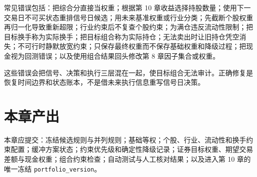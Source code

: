 \begin{warningbox}
常见错误包括：把综合分直接当权重；根据第 10 章收益选择持股数量；使用下一交易日不可买状态重排信号日候选；用未来基准权重或行业分类；先截断个股权重再归一化导致重新超限；行业约束后不复查个股约束；为满仓违反流动性限制；把目标换手称为实际换手；把目标组合称为实际持仓；无法卖出时让旧持仓凭空消失；不可行时静默放宽约束；只保存最终权重而不保存基础权重和降级过程；把现金视为回测错误；以及使用组合结果回头修改第 8 章因子集合或权重。
\end{warningbox}

这些错误会把信号、决策和执行三层混在一起，使目标组合无法审计。正确修复是恢复时间边界和状态账本，不是借未来执行信息重写信号日决策。

\section{本章产出}

\begin{outputbox}
本章应提交：冻结候选规则与并列规则；基础等权；个股、行业、流动性和换手约束配置；缓冲方案状态；约束优先级和确定性降级记录；证券目标权重、期望交易差额与现金权重；组合约束检查；自动测试与人工核对结果；以及进入第 10 章的唯一冻结 \texttt{portfolio\_version}。
\end{outputbox}

